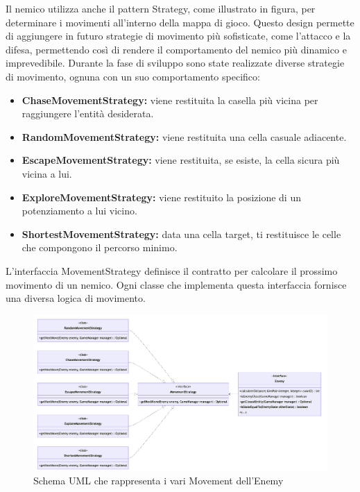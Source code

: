 \documentclass[a4paper,12pt]{report}
\begin{document}
\par
Il nemico utilizza anche il pattern Strategy, come illustrato in figura, per determinare i movimenti all’interno della mappa di gioco. Questo design permette di aggiungere in futuro strategie di movimento più sofisticate, come l’attacco e la difesa, permettendo così di rendere il comportamento del nemico più dinamico e imprevedibile. Durante la fase di sviluppo sono state realizzate diverse strategie di movimento, ognuna con un suo comportamento specifico: 
\begin{itemize}
 \item \textbf{ChaseMovementStrategy:} viene restituita la casella più vicina per raggiungere l’entità desiderata.
 \item \textbf{RandomMovementStrategy:} viene restituita una cella casuale adiacente.
 \item \textbf{EscapeMovementStrategy:} viene restituita, se esiste, la cella sicura più vicina a lui.
 \item \textbf{ExploreMovementStrategy:} viene restituito la posizione di un potenziamento a lui vicino.
 \item \textbf{ShortestMovementStrategy:} data una cella target, ti restituisce le celle che compongono il percorso minimo.
\end{itemize}

\par
L'interfaccia MovementStrategy definisce il contratto per calcolare il prossimo movimento di un nemico. Ogni classe che implementa questa interfaccia fornisce una diversa logica di movimento. 

\begin{figure}[h]
\centering{}
\includegraphics[width=\textwidth]{img/enemyMovement.png}
\caption{Schema UML che rappresenta i vari Movement dell'Enemy}
\end{figure}
\end{document}
